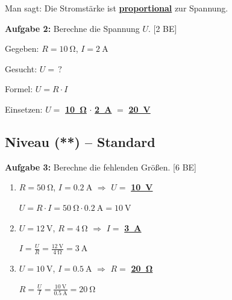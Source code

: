 \documentclass[11pt, a4paper]{article}
\newcommand{\lsg}[1]{\textcolor{loesung}{\textbf{\underline{#1}}}}
\newcommand{\niveauZwei}{\textcolor{stern2}{\textbf{(**)}}}
\newcommand{\punkte}[1]{\hfill\textcolor{grau}{\small[#1 BE]}}
\begin{document}
Man sagt: Die Stromstärke ist \lsg{proportional} zur Spannung.

\vspace{1.5em}

\textbf{Aufgabe 2:} Berechne die Spannung $U$. \punkte{2}

\begin{tcolorbox}[colback=white, colframe=physik!50, boxrule=0.5pt, arc=0pt]
Gegeben: $R = \SI{10}{\ohm}$, \quad $I = \SI{2}{\ampere}$

\vspace{0.5em}
Gesucht: $U = \,?$

\vspace{0.5em}
Formel: $U = R \cdot I$

\vspace{0.5em}
Einsetzen: $U = $ \lsg{\SI{10}{\ohm}} $\cdot$ \lsg{\SI{2}{\ampere}} $=$ \lsg{\SI{20}{\volt}}
\end{tcolorbox}

\vspace{1em}


\subsection*{Niveau \niveauZwei{} -- Standard}

\textbf{Aufgabe 3:} Berechne die fehlenden Größen. \punkte{6}

\begin{enumerate}[label=\alph*)]
    \item $R = \SI{50}{\ohm}$, \quad $I = \SI{0,2}{\ampere}$ \quad $\Rightarrow$ \quad $U = $ \lsg{\SI{10}{\volt}}

    \textcolor{loesung}{\small $U = R \cdot I = \SI{50}{\ohm} \cdot \SI{0,2}{\ampere} = \SI{10}{\volt}$}

    \vspace{0.5em}

    \item $U = \SI{12}{\volt}$, \quad $R = \SI{4}{\ohm}$ \quad $\Rightarrow$ \quad $I = $ \lsg{\SI{3}{\ampere}}

    \textcolor{loesung}{\small $I = \frac{U}{R} = \frac{\SI{12}{\volt}}{\SI{4}{\ohm}} = \SI{3}{\ampere}$}

    \vspace{0.5em}

    \item $U = \SI{10}{\volt}$, \quad $I = \SI{0,5}{\ampere}$ \quad $\Rightarrow$ \quad $R = $ \lsg{\SI{20}{\ohm}}

    \textcolor{loesung}{\small $R = \frac{U}{I} = \frac{\SI{10}{\volt}}{\SI{0,5}{\ampere}} = \SI{20}{\ohm}$}
\end{enumerate}
\end{document}
